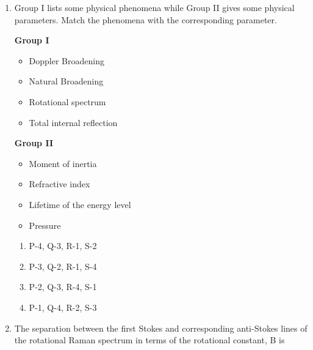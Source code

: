 \documentclass[14pt, a4paper]{extarticle}
\begin{document}
\begin{enumerate}[label=\textbf{Q. \arabic*}]
\item Group I lists some physical phenomena while Group II gives some physical parameters. Match the phenomena with the corresponding parameter.
    \begin{center}
    \begin{multicols}{2}
        \textbf{Group I}
        \begin{itemize}
            \item[P.] Doppler Broadening
            \item[Q.] Natural Broadening
            \item[R.] Rotational spectrum
            \item[S.] Total internal reflection
        \end{itemize}
        \textbf{Group II}
        \begin{itemize}
            \item[1.] Moment of inertia
            \item[2.] Refractive index
            \item[3.] Lifetime of the energy level
            \item[4.] Pressure
        \end{itemize}
    \end{multicols}
    \end{center}
    \begin{enumerate}[label=(\Alph*)]
        \item P-4, Q-3, R-1, S-2
        \item P-3, Q-2, R-1, S-4
        \item P-2, Q-3, R-4, S-1
        \item P-1, Q-4, R-2, S-3
    \end{enumerate}

\item The separation between the first Stokes and corresponding anti-Stokes lines of the rotational Raman spectrum in terms of the rotational constant, B is
    \begin{enumerate}[label=(\Alph*)]
    \end{enumerate}


\end{enumerate}
\end{document}
